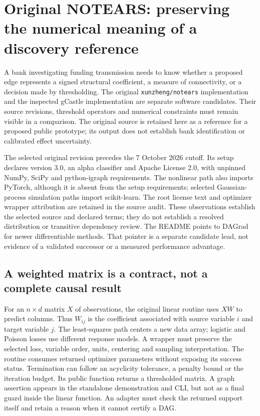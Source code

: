 \section{Original NOTEARS: preserving the numerical meaning of a discovery reference}
\label{exec23:notears-scope}
A bank investigating funding transmission needs to know whether a proposed
edge represents a signed structural coefficient, a measure of connectivity,
or a decision made by thresholding. The original \texttt{xunzheng/notears}
implementation and the inspected gCastle implementation are separate software
candidates. Their source revisions, threshold operators and numerical
constraints must remain visible in a comparison. The original source is
retained here as a reference for a proposed public prototype; its output does
not establish bank identification or calibrated effect uncertainty.
\citep{exec23_notears_source,exec20_gcastle_source}

The selected original revision precedes the 7 October 2026 cutoff. Its
setup declares version 3.0, an alpha classifier and Apache License 2.0,
with unpinned NumPy, SciPy and python-igraph requirements. The nonlinear
path also imports PyTorch, although it is absent from the setup requirements;
selected Gaussian-process simulation paths import scikit-learn. The root
license text and optimizer wrapper attribution are retained in the source
audit. These observations establish the selected source and declared terms;
they do not establish a resolved distribution or transitive dependency review.
The README points to DAGrad for newer differentiable methods. That pointer is
a separate candidate lead, not evidence of a validated successor or a measured
performance advantage.~\citep{exec23_notears_source}

\subsection{A weighted matrix is a contract, not a complete causal result}
\label{exec23:notears-matrix}
For an $n\times d$ matrix $X$ of observations, the original linear routine uses
$XW$ to predict columns. Thus $W_{ij}$ is the coefficient associated with
source variable $i$ and target variable $j$. The least-squares path centers a
new data array; logistic and Poisson losses use different response models.
A wrapper must preserve the selected loss, variable order, units, centering
and sampling interpretation. The routine consumes returned optimizer
parameters without exposing its success status. Termination can follow an
acyclicity tolerance, a penalty bound or the iteration budget. Its public
function returns a thresholded matrix. A graph assertion appears in the
standalone demonstration and CLI, but not as a final guard inside the linear
function. An adapter must check the returned support itself and retain a
reason when it cannot certify a DAG.~\citep{exec23_notears_source}

